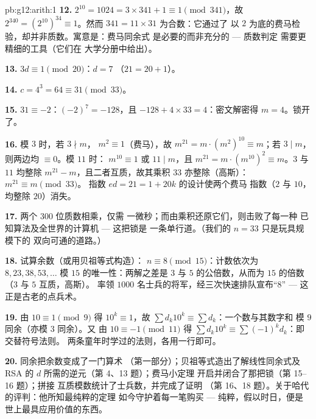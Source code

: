 \begin{solution}{pb:g12:arith:1}
\textbf{12.} $2^{10} = 1024 = 3 \times 341 + 1 \equiv 1
\pmod{341}$，故 $2^{340} = \left(2^{10}\right)^{34} \equiv
1$。然而 $341 = 11 \times 31$ 为合数：它通过了
以 $2$ 为底的费马检验，却并非质数。寓意是：费马同余式
是必要的而非充分的 --- 质数判定
需要更精细的工具（它们在
大学分册中给出）。

\textbf{13.} $3d \equiv 1 \pmod{20}$：$d = 7$
（$21 = 20 + 1$）。

\textbf{14.} $c = 4^3 = 64 \equiv 31 \pmod{33}$。

\textbf{15.} $31 \equiv -2$：$(-2)^7 = -128$，且
$-128 + 4 \times 33 = 4$：密文解密得
$m = 4$。锁开了。

\textbf{16.} 模 $3$ 时，若 $3 \nmid m$，
$m^2 \equiv 1$（费马），故
$m^{21} = m \cdot \left(m^2\right)^{10} \equiv m$；若
$3 \mid m$，则两边均 $\equiv 0$。模 $11$ 时：
$m^{10} \equiv 1$ 或 $11 \mid m$，且
$m^{21} = m \cdot \left(m^{10}\right)^2 \equiv m$。$3$ 与
$11$ 均整除 $m^{21} - m$，且二者互质，故其乘积
$33$ 亦整除（高斯）：$m^{21} \equiv m \pmod{33}$。
指数 $ed = 21 = 1 + 20k$ 的设计使两个费马
指数（$2$ 与 $10$，均整除 $20$）消失。

\textbf{17.} 两个 $300$ 位质数相乘，仅需
一微秒；而由乘积还原它们，则击败了每一种
已知算法及全世界的计算机 --- 这把锁是
一条单行道。（我们的 $n = 33$ 只是玩具规模下的
双向可通的道路。）

\textbf{18.} 试算余数（或用贝祖等式构造）：
$n \equiv 8 \pmod{15}$：计数依次为 $8, 23, 38, 53, \dots$
模 $15$ 的唯一性：两解之差是
$3$ 与 $5$ 的公倍数，从而为 $15$ 的倍数（$3$ 与 $5$ 互质，高斯）。
率领 $1000$ 名士兵的将军，经三次快速排队宣布“$8$”
--- 这正是古老的点兵术。

\textbf{19.} 由 $10 \equiv 1 \pmod 9$ 得 $10^k \equiv 1$，故
$\sum d_k 10^k \equiv \sum d_k$：一个数与其数字和
模 $9$ 同余（亦模 $3$ 同余）。又
由 $10 \equiv -1 \pmod{11}$ 得
$\sum d_k 10^k \equiv \sum (-1)^k d_k$：即交替符号法则。
两条童年时学过的法则，各用一行即可。

\textbf{20.} 同余把余数变成了一门算术
（第一部分）；贝祖等式造出了解线性同余式及 RSA
的 $d$ 所需的逆元（第 4、13 题）；费马小定理
开启并闭合了那把锁（第 15--16 题）；拼接
互质模数统计了士兵数，并完成了证明
（第 16、18 题）。关于哈代的评判：他所知最纯粹的定理
如今守护着每一笔购买 --- 纯粹，假以时日，便是
世上最具应用价值的东西。
\end{solution}
